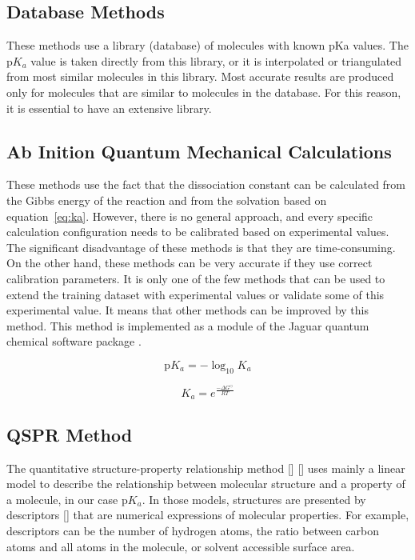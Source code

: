 \subsection{Database Methods}

These methods \cite{Sayle, Blower2006} use a library (database) of molecules
with known pKa values. The p$K_a$ value is taken directly from this library, or 
it is interpolated or triangulated from most similar molecules in this library.
Most accurate results are produced only for molecules that are similar to
molecules in the database. For this reason, it is essential to have
an extensive library.

\subsection{Ab Inition Quantum Mechanical Calculations}

These methods \cite{Liptak2002, Toth2001} use the fact that the dissociation 
constant can be calculated from the Gibbs energy of the reaction and from the
solvation based on equation~\ref{eq:ka}. However, there is no general approach,
and every specific calculation configuration needs to be calibrated based on
experimental values. The significant disadvantage of these methods is that they
are time-consuming. On the other hand, these methods can be very accurate if
they use correct calibration parameters. It is only one of the few methods that
can be used to extend the training dataset with experimental values or validate
some of this experimental value. It means that other methods can be improved
by this method. This method is implemented as a module of the Jaguar quantum
chemical software package \cite{jaguar}.

\begin{equation}
    \mathrm{p}K_a = - \log_{10} K_a
\end{equation}

\begin{equation} \label{eq:ka}
    K_a = e^{\frac{-\Delta G^\bigcirc}{RT}}
\end{equation}


\subsection{QSPR Method}

The quantitative structure-property relationship method [] [] uses mainly
a linear model to describe the relationship between molecular structure and
a property of a molecule, in our case p$K_a$. In those models, structures are
presented by descriptors [] that are numerical expressions of molecular
properties. For example, descriptors can be the number of hydrogen atoms, the 
ratio between carbon atoms and all atoms in the molecule, or solvent accessible
surface area.

